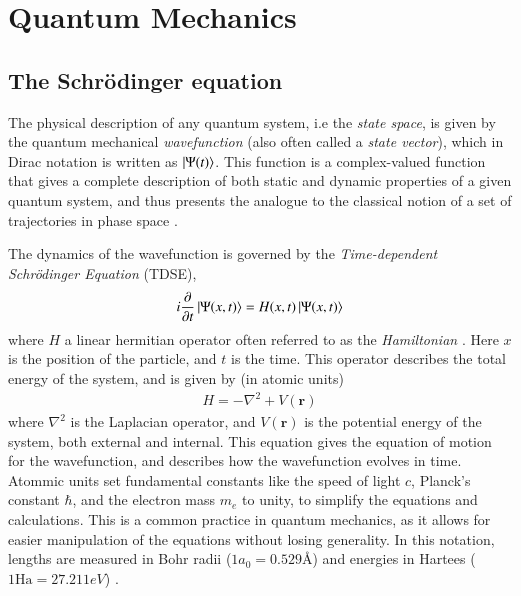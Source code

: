 \documentclass{subfiles}
\begin{document}
\section{Quantum Mechanics}
\subsection{The Schrödinger equation}
The physical description of any quantum system, i.e the \emph{state space}, is given by the quantum mechanical \emph{wavefunction} (also often called a \emph{state vector})\cite{nielsen2010quantum}, which in Dirac notation is written as $\ket{\Psi(t)}$. 
This function is a complex-valued function that gives a complete description of both static and dynamic properties of a given quantum system, and thus presents the analogue to the classical notion of a set of trajectories in phase space \cite{hochstuhl2014time}. 

The dynamics of the wavefunction is governed by the \emph{Time-dependent Schrödinger Equation} (TDSE),
\begin{equation}
    i\frac{\partial}{\partial t}\ket{\Psi(x, t)} = H(x,t)\ket{\Psi(x, t)}\label{eq:tdse}
\end{equation}
where $H$ a linear hermitian operator often referred to as the \emph{Hamiltonian} \cite{griffiths2018introduction, berera2021quantum}. Here $x$ is the position of the particle, and $t$ is the time. 
This operator describes the total energy of the system, and is given by (in atomic units)
\begin{align*}
    H = -\nabla^2 + V(\mathbf{r})
\end{align*}
where $\nabla^2$ is the Laplacian operator, and $V(\mathbf{r})$ is the potential energy of the system, both external and internal.
This equation gives the equation of motion for the wavefunction, and describes how the wavefunction evolves in time. Atommic units set fundamental constants like the speed of light $c$, Planck's constant $\hbar$, and the electron mass $m_e$ to unity, to simplify the equations and calculations. This is a common practice in quantum mechanics, as it allows for easier manipulation of the equations without losing generality. In this notation, lengths are measured in Bohr radii ($1 a_0 = 0.529Å$) and energies in Hartees ($1 \text{Ha} = 27.211 eV$) \cite{szabo1996modern}.
\end{document}
